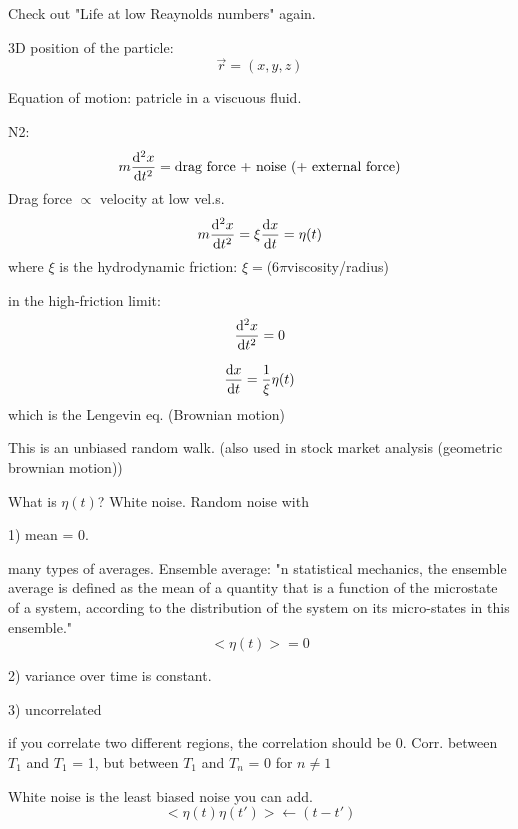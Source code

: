 \documentclass{article}
\begin{document}
Check out "Life at low Reaynolds numbers" again. 



3D position of the particle: 
\begin{equation}
	\vec r = (x,y,z)
\end{equation}

Equation of motion: patricle in a viscuous fluid. 

N2: 
\begin{equation}
	m \dv[2]{x}{t} = \text{drag force + noise (+ external force)}
\end{equation}
Drag force $\propto$ velocity at low vel.s.
\begin{equation}
	m \dv[2]{x}{t} = \xi \dv{x}{t} = \eta (t)
\end{equation}
where $\xi$ is the hydrodynamic friction: $\xi =$(6$\pi$viscosity/radius)

in the high-friction limit: \begin{equation}
	\dv[2]{x}{t} = 0
\end{equation}

\begin{equation}
	\dv {x}{t} = \frac{1}{\xi}\eta(t)
\end{equation}
which is the Lengevin eq. (Brownian motion)

This is an unbiased random walk. 
(also used in stock market analysis (geometric brownian motion))


What is $\eta(t)$? White noise. Random noise with 


1) mean = 0.

many types of averages. Ensemble average: "n statistical mechanics, the ensemble average is defined as the mean of a quantity that is a function of the microstate of a system, according to the distribution of the system on its micro-states in this ensemble."
\begin{equation}
	<\eta(t)> = 0
\end{equation}

2) variance over time is constant. 


3) uncorrelated

if you correlate two different regions, the correlation should be 0. Corr. between $T_1$ and $T_1$ = 1, but  between $T_1$ and $T_n$ = 0 for $n \neq 1$ 

White noise is the least biased noise you can add. 
\begin{equation}
	<\eta(t)\eta(t')>\leftarrow(t-t')
\end{equation}
\end{document}

